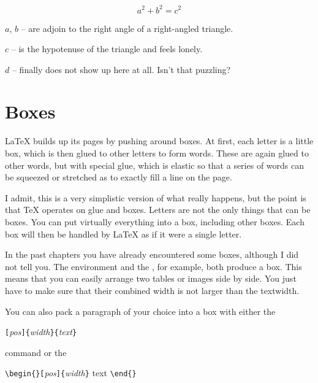 \begin{example}
\flushleft
\newenvironment{vardesc}[1]{%
  \settowidth{\parindent}{#1:\ }
  \makebox[0pt][r]{#1:\ }}{}

\begin{displaymath}
a^2+b^2=c^2
\end{displaymath}

\begin{vardesc}{Where}$a$, 
$b$ -- are adjoin to the right 
angle of a right-angled triangle.  

$c$ -- is the hypotenuse of 
the triangle and feels lonely.

$d$ -- finally does not show up 
here at all. Isn't that puzzling?
\end{vardesc}
\end{example}

\section{Boxes}
\LaTeX{} builds up its pages by pushing around boxes. At first, each
letter is a little box, which is then glued to other letters to form
words. These are again glued to other words, but with special glue,
which is elastic so that a series of words can be squeezed or
stretched as to exactly fill a line on the page. 

I admit, this is a very simplistic version of what really happens, but the
point is that \TeX{} operates on glue and boxes. Letters are not the only
things that can be boxes. You can put virtually everything into a box,
including other boxes. Each box will then be handled by \LaTeX{} as if it
were a single letter.

In the past chapters you have already encountered some boxes, although I did
not tell you. The  environment and the , for
example, both produce a box. This means that you can easily arrange two
tables or images side by side. You just have to make sure that their
combined width is not larger than the textwidth.

You can also pack a paragraph of your choice into a box with either
the

\begin{lscommand}
\verb|[|\emph{pos}\verb|]{|\emph{width}\verb|}{|\emph{text}\verb|}|
\end{lscommand}

\noindent command or the

\begin{lscommand}
\verb|\begin{|\verb|}[|\emph{pos}\verb|]{|\emph{width}\verb|}| text
\verb|\end{|\verb|}|
\end{lscommand}

